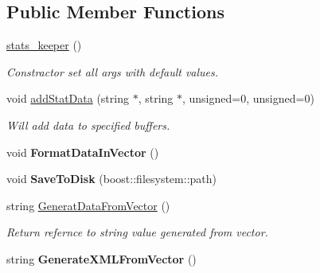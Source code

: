 \subsection*{Public Member Functions}
\begin{DoxyCompactItemize}
\item 
\hypertarget{classstats__keeper_aaae9b4375bd4436758125c29f3d90d8f}{
\hyperlink{classstats__keeper_aaae9b4375bd4436758125c29f3d90d8f}{stats\_\-keeper} ()}
\label{classstats__keeper_aaae9b4375bd4436758125c29f3d90d8f}

\begin{DoxyCompactList}\small\item\em Constractor set all args with default values. \item\end{DoxyCompactList}\item 
\hypertarget{classstats__keeper_a3a642d07e6a5e05f2a32b5698b3233d5}{
void \hyperlink{classstats__keeper_a3a642d07e6a5e05f2a32b5698b3233d5}{addStatData} (string $\ast$, string $\ast$, unsigned=0, unsigned=0)}
\label{classstats__keeper_a3a642d07e6a5e05f2a32b5698b3233d5}

\begin{DoxyCompactList}\small\item\em Will add data to specified buffers. \item\end{DoxyCompactList}\item 
\hypertarget{classstats__keeper_a6d4c92f9693d8b94401a5b9d053492f5}{
void {\bfseries FormatDataInVector} ()}
\label{classstats__keeper_a6d4c92f9693d8b94401a5b9d053492f5}

\item 
\hypertarget{classstats__keeper_a79240fdca0d52f74334757317367aa0c}{
void {\bfseries SaveToDisk} (boost::filesystem::path)}
\label{classstats__keeper_a79240fdca0d52f74334757317367aa0c}

\item 
\hypertarget{classstats__keeper_ab10c9697298961d0411df74d6759b63f}{
string \hyperlink{classstats__keeper_ab10c9697298961d0411df74d6759b63f}{GeneratDataFromVector} ()}
\label{classstats__keeper_ab10c9697298961d0411df74d6759b63f}

\begin{DoxyCompactList}\small\item\em Return refernce to string value generated from vector. \item\end{DoxyCompactList}\item 
\hypertarget{classstats__keeper_a49832367fed98f0e646b7f0bfe74d876}{
string {\bfseries GenerateXMLFromVector} ()}
\label{classstats__keeper_a49832367fed98f0e646b7f0bfe74d876}

\end{DoxyCompactItemize}
